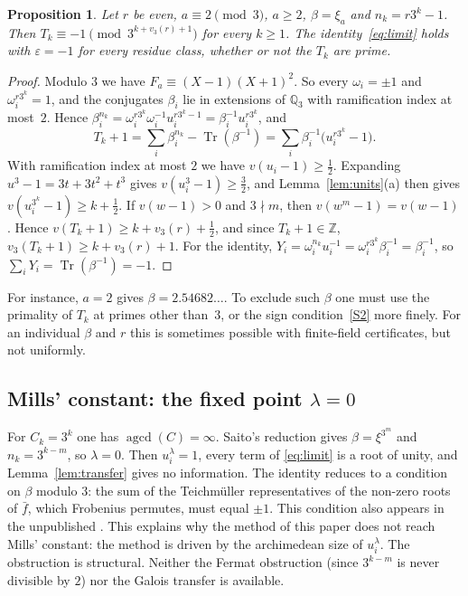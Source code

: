 \documentclass[11pt,a4paper]{article}
\newtheorem{proposition}[theorem]{Proposition}
\theoremstyle{definition}
\theoremstyle{remark}
\newcommand{\Z}{\mathbb{Z}}
\newcommand{\Qt}{\mathbb{Q}_3}
\DeclareMathOperator{\Tr}{Tr}
\DeclareMathOperator{\agcd}{agcd}
\begin{document}
\begin{proposition}\label{prop:even}
Let $r$ be even, $a\equiv2\pmod3$, $a\ge2$, $\beta=\xi_a$ and $n_k=r3^k-1$.
Then $T_k\equiv-1\pmod{3^{k+v_3(r)+1}}$ for every $k\ge1$. The identity~\eqref{eq:limit} holds with $\varepsilon=-1$ for every residue class, whether or not the $T_k$ are prime.
\end{proposition}
\begin{proof}
Modulo $3$ we have $F_a\equiv(X-1)(X+1)^2$. So every $\omega_i=\pm1$ and $\omega_i^{r3^k}=1$, and the conjugates $\beta_i$ lie in extensions of $\Qt$ with ramification index at most~$2$.
Hence $\beta_i^{n_k}=\omega_i^{r3^k}\omega_i^{-1}u_i^{r3^k-1}=\beta_i^{-1}u_i^{r3^k}$, and
\[
 T_k+1=\sum_i\beta_i^{n_k}-\Tr(\beta^{-1})=\sum_i\beta_i^{-1}\bigl(u_i^{r3^k}-1\bigr).
\]
With ramification index at most $2$ we have $v(u_i-1)\ge\frac12$. Expanding $u^3-1=3t+3t^2+t^3$ gives $v(u_i^{3}-1)\ge\frac32$, and Lemma~\ref{lem:units}(a) then gives $v(u_i^{3^k}-1)\ge k+\frac12$.
If $v(w-1)>0$ and $3\nmid m$, then $v(w^m-1)=v(w-1)$. Hence $v(T_k+1)\ge k+v_3(r)+\frac12$, and since $T_k+1\in\Z$, $v_3(T_k+1)\ge k+v_3(r)+1$.
For the identity, $Y_i=\omega_i^{n_k}u_i^{-1}=\omega_i^{r3^k}\beta_i^{-1}=\beta_i^{-1}$, so $\sum_iY_i=\Tr(\beta^{-1})=-1$.
\end{proof}
For instance, $a=2$ gives $\beta=2.54682\ldots$.
To exclude such $\beta$ one must use the primality of $T_k$ at primes other than~$3$, or the sign condition~\ref{S2} more finely. For an individual $\beta$ and $r$ this is sometimes possible with finite-field certificates, but not uniformly.

\subsection{Mills' constant: the fixed point $\lambda=0$}
For $C_k=3^k$ one has $\agcd(C)=\infty$. Saito's reduction gives $\beta=\xi^{3^m}$ \cite{SaiIrr,SaiVar} and $n_k=3^{k-m}$, so $\lambda=0$.
Then $u_i^\lambda=1$, every term of \eqref{eq:limit} is a root of unity, and Lemma~\ref{lem:transfer} gives no information.
The identity reduces to a condition on $\beta$ modulo $3$: the sum of the Teichm\"uller representatives of the non-zero roots of $\bar f$, which Frobenius permutes, must equal $\pm1$. This condition also appears in the unpublished \cite{K009}.
This explains why the method of this paper does not reach Mills' constant: the method is driven by the archimedean size of $u_i^{\lambda}$.
The obstruction is structural. Neither the Fermat obstruction (since $3^{k-m}$ is never divisible by $2$) nor the Galois transfer is available.
\end{document}
